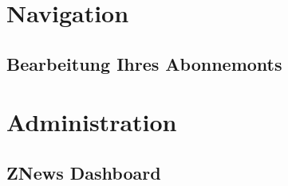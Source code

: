 

\newcommand*{\thetitle}{ZNews\\ Bedienungsanleitung}

\Begin

\section{Navigation}


\subsection{Bearbeitung Ihres Abonnemonts}


\section{Administration}

\subsection{ZNews Dashboard}


\End
